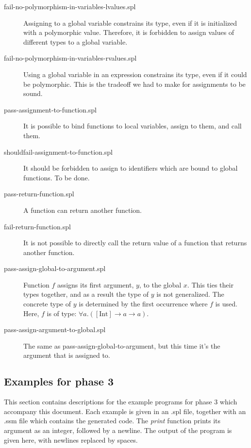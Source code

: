 \documentclass[a4paper]{article}
\newcommand{\arr}{\rightarrow}
\begin{document}
\begin{description}
  \item[fail-no-polymorphism-in-variables-lvalues.spl] Assigning to a global
  variable constrains its type, even if it is initialized with a polymorphic
  value.  Therefore, it is forbidden to assign values of different types to a
  global variable.

  \item[fail-no-polymorphism-in-variables-rvalues.spl] Using a global variable
  in an expression constrains its type, even if it could be polymorphic.  This
  is the tradeoff we had to make for assignments to be sound.

  \item[pass-assignment-to-function.spl] It is possible to bind functions to
  local variables, assign to them, and call them.

  \item[shouldfail-assignment-to-function.spl] It should be forbidden to assign
  to identifiers which are bound to global functions.  To be done.

  \item[pass-return-function.spl] A function can return another function.

  \item[fail-return-function.spl] It is not possible to directly call the return
  value of a function that returns another function.

  \item[pass-assign-global-to-argument.spl] Function $f$ assigns its first
  argument, $y$, to the global $x$.  This ties their types together, and as a
  result the type of $y$ is not generalized.  The concrete type of $y$ is
  determined by the first occurrence where $f$ is used.  Here, $f$ is of type:
  $\forall a . ([\text{Int}] \arr a \arr a)$.

  \item[pass-assign-argument-to-global.spl] The same as
  pass-assign-global-to-argument, but this time it's the argument that is
  assigned to.

\end{description}

\subsection{Examples for phase 3}
\label{sec_examplesPhase3}

This section contains descriptions for the example programs for phase 3 which
accompany this document.  Each example is given in an .spl file, together with
an .ssm file which contains the generated code.  The \emph{print} function
prints its argument as an integer, followed by a newline.  The output of the
program is given here, with newlines replaced by spaces.
\end{document}
